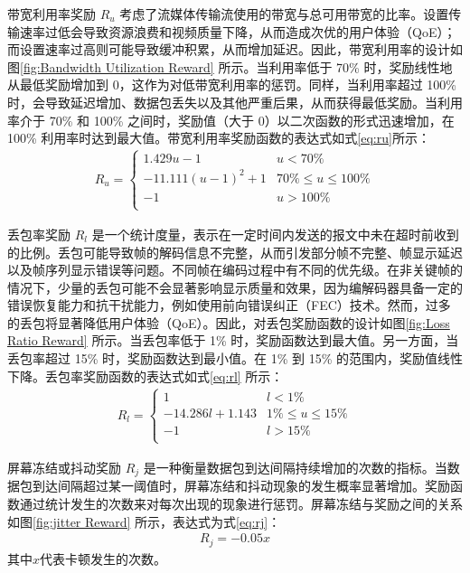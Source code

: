 带宽利用率奖励 $R_u$ 考虑了流媒体传输流使用的带宽与总可用带宽的比率。设置传输速率过低会导致资源浪费和视频质量下降，从而造成次优的用户体验（QoE）；而设置速率过高则可能导致缓冲积累，从而增加延迟。因此，带宽利用率的设计如图\ref{fig:Bandwidth Utilization Reward} 所示。当利用率低于 70\% 时，奖励线性地从最低奖励增加到 0，这作为对低带宽利用率的惩罚。同样，当利用率超过 100\% 时，会导致延迟增加、数据包丢失以及其他严重后果，从而获得最低奖励。当利用率介于 70\% 和 100\% 之间时，奖励值（大于 0）以二次函数的形式迅速增加，在 100\% 利用率时达到最大值。带宽利用率奖励函数的表达式如式\eqref{eq:ru}所示：
\begin{equation}
\begin{aligned}
R_{u} = 
    \begin{cases}
        1.429u - 1 & u < 70\%\\
        -11.111(u-1)^2 +1&  70\% \leq u \leq 100\% \\
        -1 & u > 100\%\\
    \end{cases}
\end{aligned}
\label{eq:ru}
\end{equation}

丢包率奖励 $R_l$ 是一个统计度量，表示在一定时间内发送的报文中未在超时前收到的比例。丢包可能导致帧的解码信息不完整，从而引发部分帧不完整、帧显示延迟以及帧序列显示错误等问题。不同帧在编码过程中有不同的优先级。在非关键帧的情况下，少量的丢包可能不会显著影响显示质量和效果，因为编解码器具备一定的错误恢复能力和抗干扰能力，例如使用前向错误纠正（FEC）技术。然而，过多的丢包将显著降低用户体验（QoE）。因此，对丢包奖励函数的设计如图\ref{fig:Loss Ratio Reward} 所示。当丢包率低于 1\% 时，奖励函数达到最大值。另一方面，当丢包率超过 15\% 时，奖励函数达到最小值。在 1\% 到 15\% 的范围内，奖励值线性下降。丢包率奖励函数的表达式如式\eqref{eq:rl} 所示：
\begin{equation}
\begin{aligned}
R_{l} = 
    \begin{cases}
        1 & l < 1\%\\
        -14.286l + 1.143&  1\% \leq u \leq 15\% \\
        -1 & l > 15\%\\
    \end{cases}
\end{aligned}
\label{eq:rl}
\end{equation}

屏幕冻结或抖动奖励 $R_j$ 是一种衡量数据包到达间隔持续增加的次数的指标。当数据包到达间隔超过某一阈值时，屏幕冻结和抖动现象的发生概率显著增加。奖励函数通过统计发生的次数来对每次出现的现象进行惩罚。屏幕冻结与奖励之间的关系如图\ref{fig:jitter Reward} 所示，表达式为式\eqref{eq:rj}：
\begin{equation}
\begin{aligned}
R_{j} = -0.05x
\end{aligned}
\label{eq:rj}
\end{equation}
其中$x$代表卡顿发生的次数。

